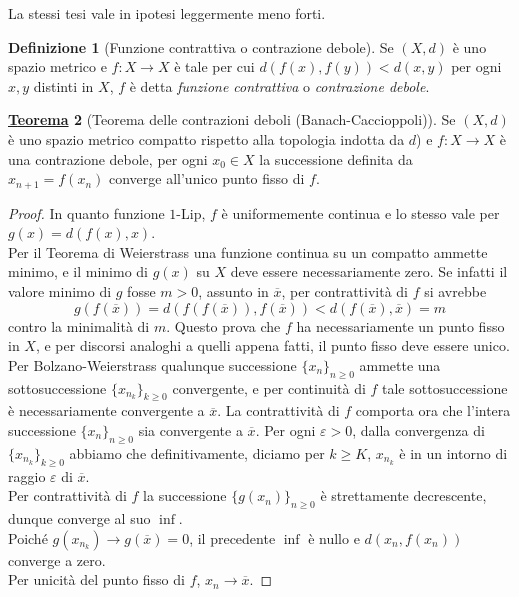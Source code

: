\documentclass[a4paper,twoside]{article}
\renewcommand{\epsilon}{\varepsilon}
\theoremstyle{definition}
\newtheorem{theorem}{\color{Red}\underline{\textrm Teorema}}
\newenvironment{theo}
  {\begin{shaded}\begin{theorem}}
  {\end{theorem}\end{shaded}}
\newtheorem{definizione}[theorem]{Definizione}
\numberwithin{theorem}{section}
\begin{document}
La stessi tesi vale in ipotesi leggermente meno forti.

\begin{definizione}[Funzione contrattiva o contrazione debole] Se $(X,d)$ è uno spazio metrico e $f:X\to X$ è tale per cui  $d(f(x),f(y))<d(x,y)$ per ogni $x,y$ distinti in $X$, $f$ è detta \emph{funzione contrattiva} o \emph{contrazione debole}. 
\end{definizione}

\begin{theo}[Teorema delle contrazioni deboli (Banach-Caccioppoli)] Se $(X,d)$ è uno spazio metrico compatto rispetto alla topologia indotta da $d$) e $f:X\to X$ è una contrazione debole, per ogni $x_0\in X$ la successione definita da $x_{n+1}=f(x_n)$ converge all'unico punto fisso di $f$. 
\end{theo}

\begin{proof}
In quanto funzione $1$-Lip, $f$ è uniformemente continua e lo stesso vale per $g(x)=d(f(x),x)$.\\ Per il Teorema di Weierstrass una funzione continua su un compatto ammette minimo, e il minimo di $g(x)$ su $X$ deve essere necessariamente zero. Se infatti il valore minimo di $g$ fosse $m>0$, assunto in $\overline{x}$, per contrattività di $f$ si avrebbe 
$$ g(f(\overline{x})) = d(f(f(\overline{x})),f(\overline{x})) < d(f(\overline{x}),\overline{x}) = m $$
contro la minimalità di $m$. Questo prova che $f$ ha necessariamente un punto fisso in $X$, e per discorsi analoghi a quelli appena fatti, il punto fisso deve essere unico. Per Bolzano-Weierstrass qualunque successione $\{x_n\}_{n\geq 0}$ ammette una sottosuccessione $\{x_{n_k}\}_{k\geq 0}$ convergente, e per continuità di $f$ tale sottosuccessione è necessariamente convergente a $\overline{x}$. La contrattività di $f$ comporta ora che l'intera successione $\{x_n\}_{n\geq 0}$ sia convergente a $\overline{x}$. Per ogni $\epsilon > 0$,  dalla convergenza di $\{x_{n_k}\}_{k\geq 0}$ abbiamo che definitivamente, diciamo per $k\geq K$, $x_{n_k}$ è in un intorno di raggio $\epsilon$ di $\overline{x}$.\\ 
Per contrattività di $f$ la successione $\{g(x_n)\}_{n\geq 0}$ è strettamente decrescente, dunque converge al suo $\inf$.\\ Poiché $g(x_{n_k})\to g(\overline{x}) = 0$, il precedente $\inf$ è nullo e $d(x_n,f(x_n))$ converge a zero.\\ Per unicità del punto fisso di $f$, $x_n\to\overline{x}$.\end{proof}
\end{document}
